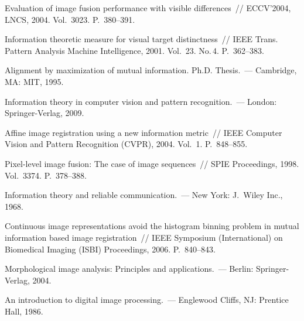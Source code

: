 \begin{multicols}{2}
{{\begin{thebibliography}{99}
 Evaluation of image fusion performance with visible differences~// 
ECCV'2004, LNCS, 2004. Vol.~3023. P.~380--391.

Information theoretic measure for visual target distinctness~// IEEE Trans. Pattern 
Analysis Machine Intelligence, 2001. Vol.~23. No.\,4. P.~362--383.

Alignment by maximization of mutual information. Ph.D. Thesis.~--- Cambridge, MA: MIT, 1995.

Information theory in computer vision and pattern recognition.~--- London: Springer-Verlag, 2009.

Affine image registration using a new information metric~// IEEE Computer Vision and Pattern 
Recognition (CVPR), 2004. Vol.~1. P.~848--855.

Pixel-level image fusion: The case of image sequences~// SPIE Proceedings, 1998. Vol.~3374. 
P.~378--388.

Information theory and reliable communication.~--- New York: J.\ Wiley Inc., 1968.

Continuous image representations avoid the histogram binning problem in mutual information 
based image registration~// IEEE Symposium (International) on Biomedical Imaging \mbox{(ISBI)} 
Proceedings, 2006. P.~840--843.

Morphological image analysis: Principles and applications.~--- Berlin: Springer-Verlag, 2004.

\label{end\stat}


An introduction to digital image processing.~--- Englewood Cliffs, NJ: Prentice Hall, 1986.
 \end{thebibliography}
}
}


\end{multicols}       